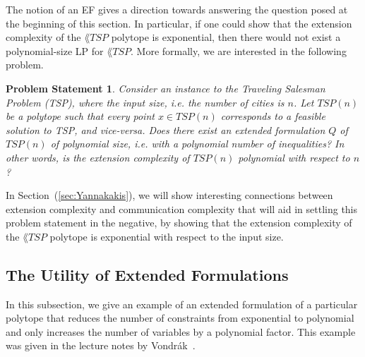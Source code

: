 \documentclass{article}
\newtheorem{probstate}[theorem]{\sc Problem Statement}
\theoremstyle{definition}
\theoremstyle{remark}
\begin{document}
The notion of an EF gives a direction towards answering the question posed at the beginning of this section. In particular, if one could show that the extension complexity of the $\lang{TSP}$ polytope is exponential, then there would not exist a polynomial-size LP for $\lang{TSP}$. More formally, we are interested in the following problem.

\begin{probstate}
Consider an instance to the Traveling Salesman Problem (TSP), where the input size, i.e. the number of cities is $n$. Let $TSP(n)$ be a polytope such that every point $x \in TSP(n)$ corresponds to a feasible solution to TSP, and vice-versa. Does there exist an extended formulation $Q$ of $TSP(n)$ of polynomial size, i.e. with a polynomial number of inequalities? In other words, is the extension complexity of $TSP(n)$ polynomial with respect to $n$?
\end{probstate}

In Section~(\ref{sec:Yannakakis}), we will show interesting connections between extension complexity and communication complexity that will aid in settling this problem statement in the negative, by showing that the extension complexity of the $\lang{TSP}$ polytope is exponential with respect to the input size.

\subsection{The Utility of Extended Formulations}\label{sec:utility-EF}

In this subsection, we give an example of an extended formulation of a particular polytope that reduces the number of constraints from exponential to polynomial and only increases the number of variables by a polynomial factor. This example was given in the lecture notes by Vondr\'ak~\cite{vondrak-class}.
\end{document}
